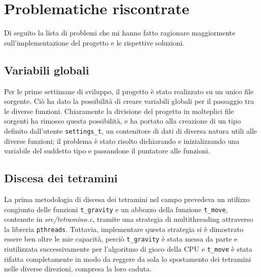 \documentclass[a4paper]{article}
\begin{document}
\newpage

\section{Problematiche riscontrate}
Di seguito la lista di problemi che mi hanno fatto ragionare maggiormente sull'implementazione del progetto e le rispettive soluzioni.\\

\subsection{Variabili globali}
Per le prime settimane di sviluppo, il progetto è stato realizzato su un unico file sorgente. Ciò ha dato la possibilità di creare variabili globali per il passaggio tra le diverse funzioni. Chiaramente la divisione del progetto in molteplici file sorgenti ha rimosso questa possibilità, e ha portato alla creazione di un tipo definito dall'utente \texttt{settings_t}, un contenitore di dati di diversa natura utili alle diverse funzioni; il problema è stato risolto dichiarando e inizializzando una variabile del suddetto tipo e passandone il puntatore alle funzioni.

\subsection{Discesa dei tetramini}
La prima metodologia di discesa dei tetramini nel campo prevedeva un utilizzo congiunto delle funzioni \texttt{t_gravity} e un abbozzo della funzione \texttt{t_move}, contenute in \textit{src/tetramino.c}, tramite una strategia di multithreading attraverso la libreria \texttt{pthreads}. Tuttavia, implementare questa strategia si è dimostrato essere ben oltre le mie capacità, perciò \texttt{t_gravity} è stata messa da parte e riutilizzata successivamente per l'algoritmo di gioco della CPU e \texttt{t_move} è stata rifatta completamente in modo da reggere da sola lo spostamento dei tetramini nelle diverse direzioni, compresa la loro caduta.
\end{document}
